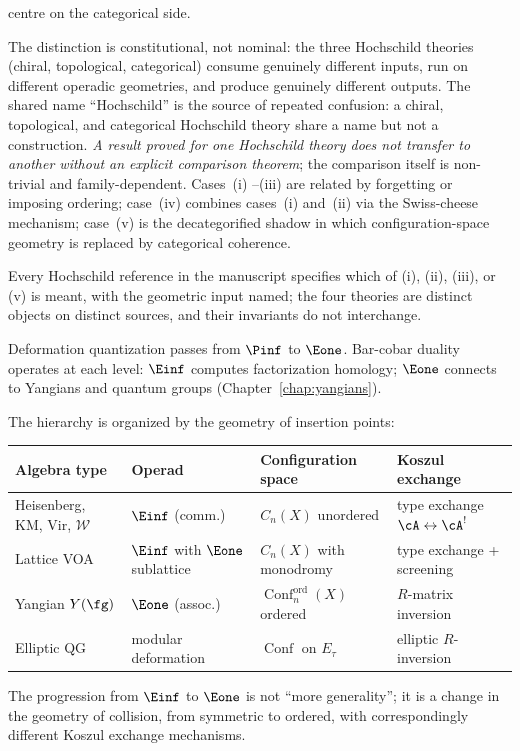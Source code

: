 \begin{principle}
\begin{enumerate}[label=\textup{(\roman*)}]
 centre on the categorical side.
\end{enumerate}
The distinction is constitutional, not nominal: the three
Hochschild theories
(chiral, topological, categorical) consume genuinely different
inputs, run on different operadic geometries, and produce
genuinely different outputs. The shared name ``Hochschild'' is
the source of repeated confusion: a chiral, topological, and
categorical Hochschild theory share a name but not a construction.
\emph{A result proved for one Hochschild theory does not transfer to
another without an explicit comparison theorem}; the comparison
itself is non-trivial and family-dependent. Cases~\textup{(i)
--(iii)} are related by forgetting or imposing ordering;
case~\textup{(iv)} combines cases~\textup{(i)} and~\textup{(ii)}
via the Swiss-cheese mechanism; case~\textup{(v)} is the
decategorified shadow in which configuration-space geometry is
replaced by categorical coherence.

Every Hochschild reference in the manuscript specifies which of
\textup{(i)}, \textup{(ii)}, \textup{(iii)}, or \textup{(v)} is
meant, with the geometric input named; the four theories are
distinct objects on distinct sources, and their invariants do
not interchange.
\end{principle}

Deformation quantization passes from $\Pinf$ to $\Eone$.
Bar-cobar duality operates at each level: $\Einf$ computes
factorization homology; $\Eone$ connects to Yangians and quantum
groups (Chapter~\ref{chap:yangians}).

\begin{remark}
\label{rem:operadic-hierarchy-table}
The hierarchy is organized by the geometry of insertion points:
\begin{center}
\small
\begin{tabular}{llll}
\textbf{Algebra type} & \textbf{Operad} &
 \textbf{Configuration space} & \textbf{Koszul exchange} \\ \hline
Heisenberg, KM, Vir, $\mathcal{W}$
 & $\Einf$ (comm.)
 & $C_n(X)$ unordered
 & type exchange $\cA \leftrightarrow \cA^!$ \\[2pt]
Lattice VOA
 & $\Einf$ with $\Eone$ sublattice
 & $C_n(X)$ with monodromy
 & type exchange + screening \\[2pt]
Yangian $Y(\fg)$
 & $\Eone$ (assoc.)
 & $\operatorname{Conf}_n^{\mathrm{ord}}(X)$ ordered
 & $R$-matrix inversion \\[2pt]
Elliptic QG
 & modular deformation
 & $\operatorname{Conf}$ on $E_\tau$
 & elliptic $R$-inversion
\end{tabular}
\end{center}
The progression from $\Einf$ to $\Eone$ is not ``more
generality''; it is a change in the geometry of collision, from
symmetric to ordered, with correspondingly different Koszul
exchange mechanisms.
\end{remark}

